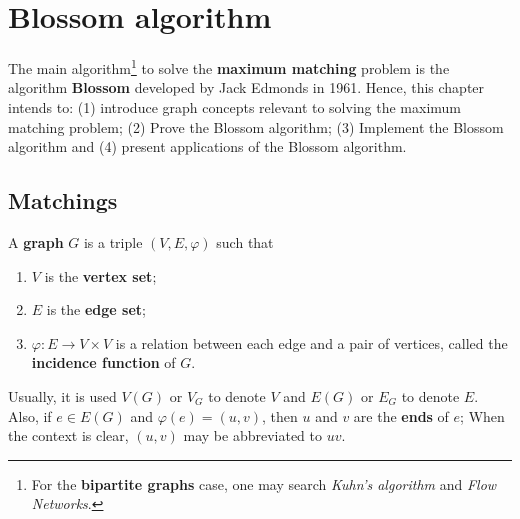 \renewcommand*{\proofname}{Proof}

\chapter{Blossom algorithm}

The main algorithm\footnote{For the \textbf{bipartite graphs} case, one may search \textit{Kuhn's algorithm} and \textit{Flow Networks}.} to solve the \textbf{maximum matching} problem is the algorithm \textbf{Blossom} developed by Jack Edmonds in 1961.
Hence, this chapter intends to: 
(1) introduce graph concepts relevant to solving the maximum matching problem;
(2) Prove the Blossom algorithm; 
(3) Implement the Blossom algorithm and 
(4) present applications of the Blossom algorithm.

\enlargethispage{.5\baselineskip}

\section{Matchings}

\begin{definition}[Graph]
	\label{def:graph}
	A \textbf{graph} \(G\) is a triple \((V, E, \varphi)\) such that
	\begin{enumerate}[label=(\roman*)]
		\item \(V\) is the \textbf{vertex set};
		\item \(E\) is the \textbf{edge set};
		\item \(\varphi: E \to V \times V\) is a relation between each edge and a pair of vertices, called the \textbf{incidence function} of \(G\).
	\end{enumerate}
	Usually, it is used 
	\(V(G)\) or \(V_G\) to denote \(V\) and 
	\(E(G)\) or \(E_G\) to denote \(E\).
	Also, if \(e \in E(G)\) and \(\varphi(e) = (u, v)\), then \(u\) and \(v\) are the \textbf{ends} of \(e\);
	When the context is clear, \((u, v)\) may be abbreviated to \(uv\).

\end{definition}

